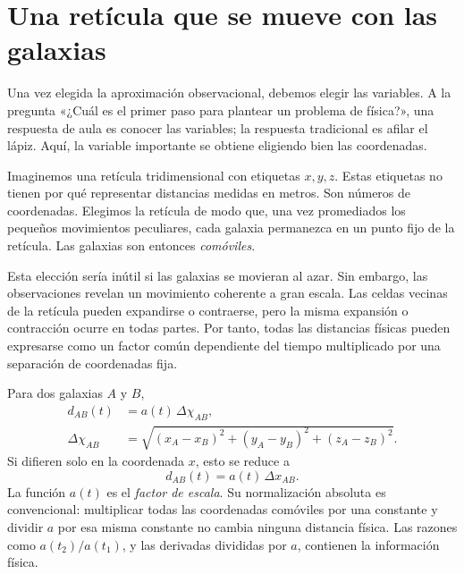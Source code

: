 \begin{classroomqa}
\end{classroomqa}

\section{Una retícula que se mueve con las galaxias}

Una vez elegida la aproximación observacional, debemos elegir las variables. A la pregunta «¿Cuál es el primer paso para plantear un problema de física?», una respuesta de aula es conocer las variables; la respuesta tradicional es afilar el lápiz. Aquí, la variable importante se obtiene eligiendo bien las coordenadas.

Imaginemos una retícula tridimensional con etiquetas \(x,y,z\). Estas etiquetas no tienen por qué representar distancias medidas en metros. Son números de coordenadas. Elegimos la retícula de modo que, una vez promediados los pequeños movimientos peculiares, cada galaxia permanezca en un punto fijo de la retícula. Las galaxias son entonces \emph{comóviles}.

Esta elección sería inútil si las galaxias se movieran al azar. Sin embargo, las observaciones revelan un movimiento coherente a gran escala. Las celdas vecinas de la retícula pueden expandirse o contraerse, pero la misma expansión o contracción ocurre en todas partes. Por tanto, todas las distancias físicas pueden expresarse como un factor común dependiente del tiempo multiplicado por una separación de coordenadas fija.

Para dos galaxias \(A\) y \(B\),
\begin{equation}
\begin{aligned}
d_{AB}(t)&=a(t)\,\Delta\chi_{AB},\\
\Delta\chi_{AB}
&=\sqrt{(x_A-x_B)^2+(y_A-y_B)^2+(z_A-z_B)^2}.
\end{aligned}
\label{eq:c01-physical-distance}
\end{equation}
Si difieren solo en la coordenada \(x\), esto se reduce a
\begin{equation}
d_{AB}(t)=a(t)\,\Delta x_{AB}.
\end{equation}
La función \(a(t)\) es el \emph{factor de escala}. Su normalización absoluta es convencional: multiplicar todas las coordenadas comóviles por una constante y dividir \(a\) por esa misma constante no cambia ninguna distancia física. Las razones como \(a(t_2)/a(t_1)\), y las derivadas divididas por \(a\), contienen la información física.

